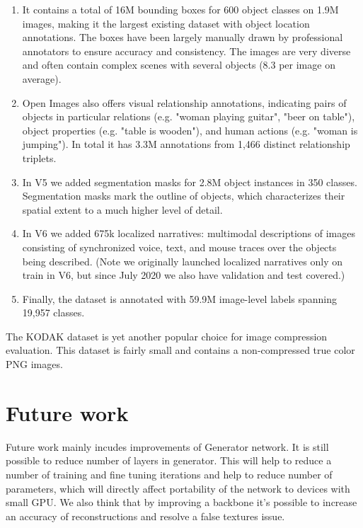 \begin{enumerate}
    \item It contains a total of 16M bounding boxes for 600 object classes on 1.9M images, making it the largest existing dataset with object location annotations. The boxes have been largely manually drawn by professional annotators to ensure accuracy and consistency. The images are very diverse and often contain complex scenes with several objects (8.3 per image on average).
    \item Open Images also offers visual relationship annotations, indicating pairs of objects in particular relations (e.g. "woman playing guitar", "beer on table"), object properties (e.g. "table is wooden"), and human actions (e.g. "woman is jumping"). In total it has 3.3M annotations from 1,466 distinct relationship triplets.
    \item In V5 we added segmentation masks for 2.8M object instances in 350 classes. Segmentation masks mark the outline of objects, which characterizes their spatial extent to a much higher level of detail.
    \item In V6 we added 675k localized narratives: multimodal descriptions of images consisting of synchronized voice, text, and mouse traces over the objects being described. (Note we originally launched localized narratives only on train in V6, but since July 2020 we also have validation and test covered.)
    \item Finally, the dataset is annotated with 59.9M image-level labels spanning 19,957 classes.
\end{enumerate}

The KODAK \cite{kodak} dataset is yet another popular choice for image compression evaluation. This dataset is fairly small and contains a non-compressed true color PNG images.

\chapter{Future work}

Future work mainly incudes improvements of Generator network. It is still possible to reduce number of layers in generator. This will help to reduce a number of training and fine tuning iterations and help to reduce number of parameters, which will directly affect portability of the network to devices with small GPU. We also think that by improving a backbone it's possible to increase an accuracy of reconstructions and resolve a false textures issue.

